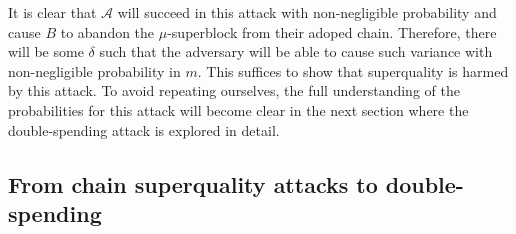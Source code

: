 It is clear
that $\mathcal{A}$ will succeed in this attack with non-negligible probability
and cause $B$ to abandon the $\mu$-superblock from their adoped chain.
Therefore, there will be some $\delta$ such that the adversary will be able to
cause such variance with non-negligible probability in $m$. This suffices to
show that superquality is harmed by this attack.
To avoid repeating ourselves, the full understanding of the probabilities for
this attack will become clear in the next section where the double-spending
attack is explored in detail.

\subsection{From chain superquality attacks to double-spending}

%
%

